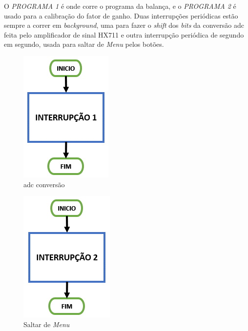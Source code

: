 O \textit{PROGRAMA 1} é onde corre o programa da balança, e o \textit{PROGRAMA 2} é usado para a calibração do fator de ganho.
\newpage
Duas interrupções periódicas estão sempre a correr em \textit{background}, uma para fazer o \textit{shift} dos \textit{bits} da conversão \acs{adc} feita pelo amplificador de sinal HX711 e outra interrupção periódica de segundo em segundo, usada para saltar de \textit{Menu} pelos botões.
\\
\begin{minipage}{\linewidth}
	\begin{minipage}{.5\linewidth}
		\begin{figure}[H]
			\centering
			\includegraphics[scale=.85]{./image/PESTA/flowchart/Interrupt-1.jpg}
			\caption{\acs{adc} conversão}
			\label{Interrupt_1}
		\end{figure}
	\end{minipage}
	\begin{minipage}{.5\linewidth}
		\begin{figure}[H]
			\centering
			\includegraphics[scale=.85]{./image/PESTA/flowchart/Interrupt-2.jpg}
			\caption{Saltar de \textit{Menu}}
			\label{Interrupt_2}
		\end{figure}
	\end{minipage}
\end{minipage}
